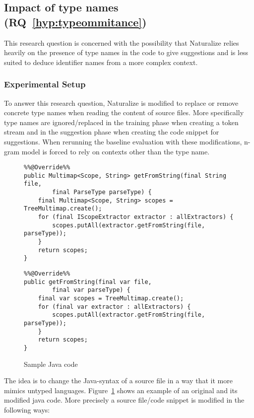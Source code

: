 \subsection{Impact of type names (RQ~\ref{hyp:typeommitance})}
This research question is concerned with the possibility that Naturalize relies heavily on the presence of type names in the code to give suggestions and is less suited to deduce identifier names from a more complex context.

\subsubsection{Experimental Setup}
To answer this research question, Naturalize is modified to replace or remove concrete type names when reading the content of source files. More specifically type names are ignored/replaced in the training phase when creating a token stream and in the suggestion phase when creating the code snippet for suggestions. When rerunning the baseline evaluation with these modifications, n-gram model is forced to rely on contexts other than the type name.

\begin{figure}
    \centering
\begin{lstlisting}
%%@Override%%
public Multimap<Scope, String> getFromString(final String file,
		final ParseType parseType) {
	final Multimap<Scope, String> scopes = TreeMultimap.create();
	for (final IScopeExtractor extractor : allExtractors) {
		scopes.putAll(extractor.getFromString(file, parseType));
	}
	return scopes;
}
\end{lstlisting}%
\begin{lstlisting}
%%@Override%%
public getFromString(final var file,
		final var parseType) {
	final var scopes = TreeMultimap.create();
	for (final var extractor : allExtractors) {
		scopes.putAll(extractor.getFromString(file, parseType));
	}
	return scopes;
}
\end{lstlisting}%
    \caption{Sample Java code}
    \label{fig:meth_javacode}
\end{figure}

The idea is to change the Java-syntax of a source file in a way that it more mimics untyped languages. Figure~\ref{fig:meth_javacode} shows an example of an original and its modified java code. More precisely a source file/code snippet is modified in the following ways:

